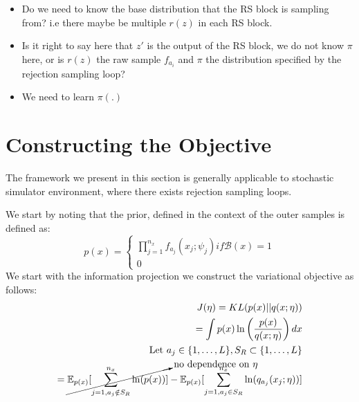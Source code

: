 \documentclass{article}
\begin{document}
\begin{itemize}
  \item Do we need to know the base distribution that the RS block is sampling from? i.e there maybe be multiple $r(z)$ in each 
  RS block. 
  \item Is it right to say here that $z\prime$ is the output of the RS block, we do not know $\pi$ here, or is $r(z)$ the raw sample $f_{a_i}$ and $\pi$ the distribution specified by the rejection sampling loop? 
  \item We need to learn $\pi(.)$
\end{itemize}

\section{Constructing the Objective}

The framework we present in this section is generally applicable to stochastic simulator 
environment, where there exists rejection sampling loops. 

We start by noting that the prior, defined in the context of the outer samples is 
defined as: 
\begin{equation}
  p(x) = 
  \begin{cases}
    \prod^{n_{x}}_{j=1} f_{a_j}(x_j ; \psi_j) if \mathcal{B}(x) = 1 \\
    0
  \end{cases}
\end{equation}
We start with the information projection we construct the variational objective as follows:
\begin{align*}
  J(\eta) = KL(p(x) || q(x; \eta)) \\
   = \int p(x)\ln\left(\frac{p(x)}{q(x;\eta)}\right) dx \\
   \text{Let } a_{j} \in \{1, \ldots, L\} , S_{R} \subset \{1, \ldots, L\} \\
   = \cancelto{\text{no dependence on } \eta}{\mathbb{E}_{p(x)}[\sum^{n_x}_{j=1,a_j \notin S_{R}}\ln(p(x))]}-\mathbb{E}_{p(x)}[\sum^{n_x}_{j=1,a_j \in S_{R}}\ln(q_{a_j}(x_j;\eta))]\\
\end{align*}
\end{document}
